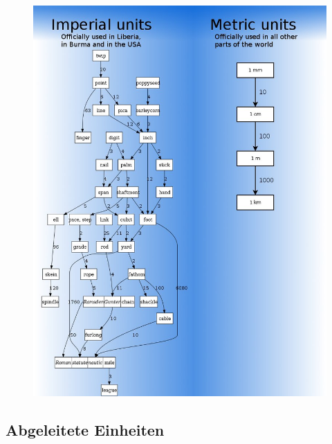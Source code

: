 \begin{frame}
  \begin{center}
    \begin{figure}
      \includegraphics[height=.9\textheight]{e01/imperial_vs_metric.jpeg}
    \end{figure}
  \end{center}

\end{frame}

\subsection{Abgeleitete Einheiten}

